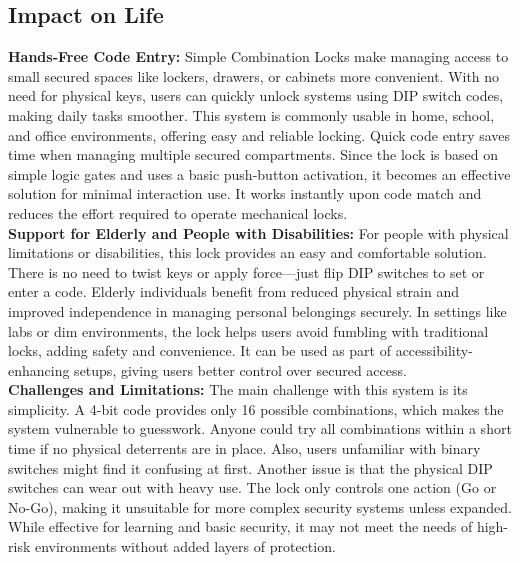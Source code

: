 \subsection{Impact on Life}
\textbf {Hands-Free Code Entry:} Simple Combination Locks make managing access to small secured spaces like lockers, drawers, or cabinets more convenient. With no need for physical keys, users can quickly unlock systems using DIP switch codes, making daily tasks smoother. This system is commonly usable in home, school, and office environments, offering easy and reliable locking. Quick code entry saves time when managing multiple secured compartments. Since the lock is based on simple logic gates and uses a basic push-button activation, it becomes an effective solution for minimal interaction use. It works instantly upon code match and reduces the effort required to operate mechanical locks.\\
\newline
\textbf{Support for Elderly and People with Disabilities:}
For people with physical limitations or disabilities, this lock provides an easy and comfortable solution. There is no need to twist keys or apply force—just flip DIP switches to set or enter a code. Elderly individuals benefit from reduced physical strain and improved independence in managing personal belongings securely. In settings like labs or dim environments, the lock helps users avoid fumbling with traditional locks, adding safety and convenience. It can be used as part of accessibility-enhancing setups, giving users better control over secured access.\\
\newline
\textbf{Challenges and Limitations:}
The main challenge with this system is its simplicity. A 4-bit code provides only 16 possible combinations, which makes the system vulnerable to guesswork. Anyone could try all combinations within a short time if no physical deterrents are in place. Also, users unfamiliar with binary switches might find it confusing at first. Another issue is that the physical DIP switches can wear out with heavy use. The lock only controls one action (Go or No-Go), making it unsuitable for more complex security systems unless expanded. While effective for learning and basic security, it may not meet the needs of high-risk environments without added layers of protection.\cite{4.1.1}

